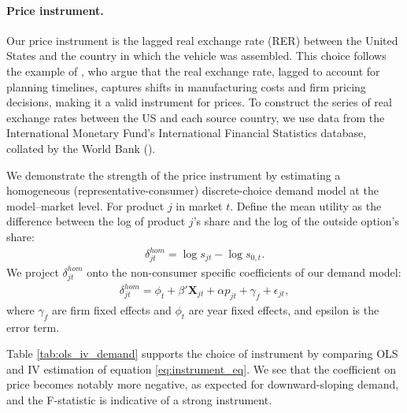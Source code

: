 \documentclass[11pt]{article}
\begin{document}
\paragraph{Price instrument.}
Our price instrument is the lagged real exchange rate (RER) between the United States and the country in which the vehicle was assembled. This choice follows the example of \cite{grieco_evolution_2024}, who argue that the real exchange rate, lagged to account for planning timelines, captures shifts in manufacturing costs and firm pricing decisions, making it a valid instrument for prices. To construct the series of real exchange rates between the US and each source country, we use data from the International Monetary Fund's International Financial Statistics database, collated by the World Bank (\cite{international_monetary_fund_international_2025}).

We demonstrate the strength of the price instrument by estimating a homogeneous (representative-consumer) discrete-choice demand model at the model–market level. For product $j$ in market $t$. Define the mean utility as the difference between the log of product $ j$'s share and the log of the outside option's share:
\begin{align*}
    \delta_{jt}^{hom} = \log s_{jt} - \log s_{0,t}.
\end{align*}
We project $\delta_{jt}^{hom}$ onto the non-consumer specific coefficients of our demand model:
\begin{align}\label{eq:instrument_eq}
    \delta_{jt}^{hom} = \phi_t + \beta'\textbf{X}_{jt} + \alpha p_{jt} + \gamma_f + \epsilon_{jt},
\end{align}
\noindent where $\gamma_f$ are firm fixed effects and $\phi_t$ are year fixed effects, and epsilon is the error term.

Table \ref{tab:ols_iv_demand} supports the choice of instrument by comparing OLS and IV estimation of equation \eqref{eq:instrument_eq}. We see that the coefficient on price becomes notably more negative, as expected for downward-sloping demand, and the F-statistic is indicative of a strong instrument.
\end{document}
